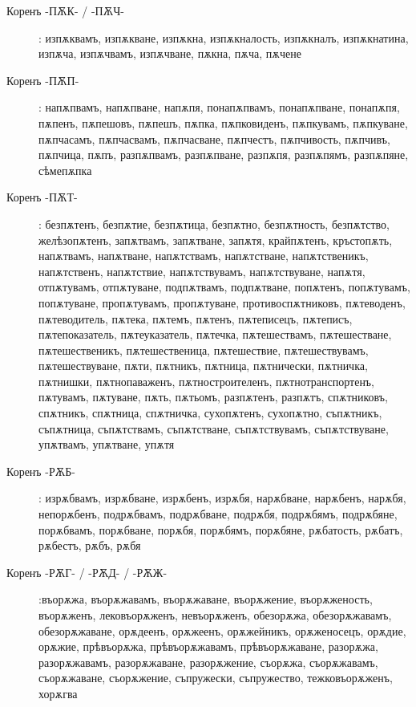 \documentclass{article}
\begin{document}
\begin{description}
	\item[Коренъ -ПѪК- / -ПѪЧ-]: изпѫквамъ, изпѫкване, изпѫкна, изпѫкналость, изпѫкналъ, изпѫкнатина, изпѫча, изпѫчвамъ, изпѫчване, пѫкна, пѫча, пѫчене
	
	\item[Коренъ -ПѪП-]: напѫпвамъ, напѫпване, напѫпя, понапѫпвамъ, понапѫпване, понапѫпя, пѫпенъ, пѫпешовъ, пѫпешъ, пѫпка, пѫпковиденъ, пѫпкувамъ, пѫпкуване, пѫпчасамъ, пѫпчасвамъ, пѫпчасване, пѫпчестъ, пѫпчивость, пѫпчивъ, пѫпчица, пѫпъ, разпѫпвамъ, разпѫпване, разпѫпя, разпѫпямъ, разпѫпяне, сѣмепѫпка
	
	\item[Коренъ -ПѪТ-]: безпѫтенъ, безпѫтие, безпѫтица, безпѫтно, безпѫтность, безпѫтство, желѣзопѫтенъ, запѫтвамъ, запѫтване, запѫтя, крайпѫтенъ, кръстопѫть, напѫтвамъ, напѫтване, напѫтствамъ, напѫтстване, напѫтственикъ, напѫтственъ, напѫтствие, напѫтствувамъ, напѫтствуване, напѫтя, отпѫтувамъ, отпѫтуване, подпѫтвамъ, подпѫтване, попѫтенъ, попѫтувамъ, попѫтуване, пропѫтувамъ, пропѫтуване, противоспѫтниковъ, пѫтеводенъ, пѫтеводитель, пѫтека, пѫтемъ, пѫтенъ, пѫтеписецъ, пѫтеписъ, пѫтепоказатель, пѫтеуказатель, пѫтечка, пѫтешествамъ, пѫтешестване, пѫтешественикъ, пѫтешественица, пѫтешествие, пѫтешествувамъ, пѫтешествуване, пѫти, пѫтникъ, пѫтница, пѫтнически, пѫтничка, пѫтнишки, пѫтнопаваженъ, пѫтностроителенъ, пѫтнотранспортенъ, пѫтувамъ, пѫтуване, пѫть, пѫтьомъ, разпѫтенъ, разпѫтъ, спѫтниковъ, спѫтникъ, спѫтница, спѫтничка, сухопѫтенъ, сухопѫтно, съпѫтникъ, съпѫтница, съпѫтствамъ, съпѫтстване, съпѫтствувамъ, съпѫтствуване, упѫтвамъ, упѫтване, упѫтя
	
	\item[Коренъ -РѪБ-]: изрѫбвамъ, изрѫбване, изрѫбенъ, изрѫбя, нарѫбване, нарѫбенъ, нарѫбя, непорѫбенъ, подрѫбвамъ, подрѫбване, подрѫбя, подрѫбямъ, подрѫбяне, порѫбвамъ, порѫбване, порѫбя, порѫбямъ, порѫбяне, рѫбатость, рѫбатъ, рѫбестъ, рѫбъ, рѫбя
	
	\item[Коренъ -РѪГ- / -РѪД- / -РѪЖ-]:въорѫжа, въорѫжавамъ, въорѫжаване, въорѫжение, въорѫженость, въорѫженъ, лековъорѫженъ, невъорѫженъ, обезорѫжа, обезорѫжавамъ, обезорѫжаване, орѫдеенъ, орѫжеенъ, орѫжейникъ, орѫженосецъ, орѫдие, орѫжие, прѣвъорѫжа, прѣвъорѫжавамъ, прѣвъорѫжаване, разорѫжа, разорѫжавамъ, разорѫжаване, разорѫжение, съорѫжа, съорѫжавамъ, съорѫжаване, съорѫжение, съпружески, съпружество, тежковъорѫженъ, хорѫгва
	

\end{description}
\end{document}
